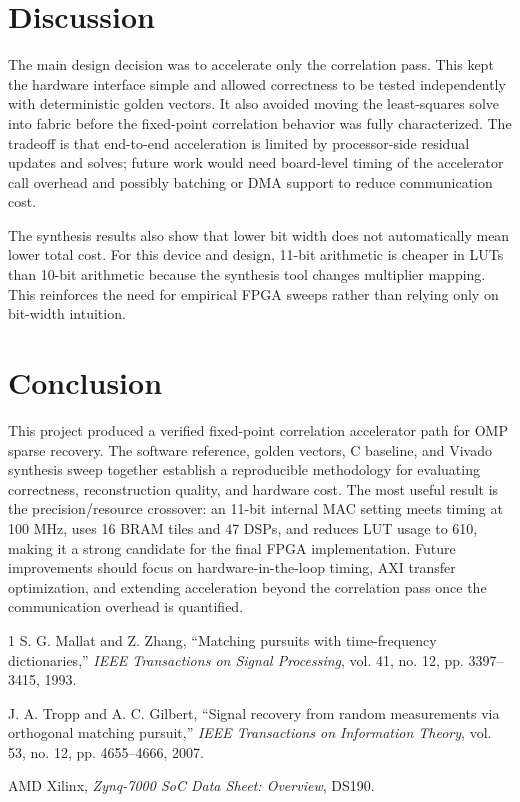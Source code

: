 \documentclass[onecolumn,conference]{IEEEtran}
\begin{document}
\section{Discussion}
The main design decision was to accelerate only the correlation pass. This kept the hardware interface simple and allowed correctness to be tested independently with deterministic golden vectors. It also avoided moving the least-squares solve into fabric before the fixed-point correlation behavior was fully characterized. The tradeoff is that end-to-end acceleration is limited by processor-side residual updates and solves; future work would need board-level timing of the accelerator call overhead and possibly batching or DMA support to reduce communication cost.

The synthesis results also show that lower bit width does not automatically mean lower total cost. For this device and design, 11-bit arithmetic is cheaper in LUTs than 10-bit arithmetic because the synthesis tool changes multiplier mapping. This reinforces the need for empirical FPGA sweeps rather than relying only on bit-width intuition.

\section{Conclusion}
This project produced a verified fixed-point correlation accelerator path for OMP sparse recovery. The software reference, golden vectors, C baseline, and Vivado synthesis sweep together establish a reproducible methodology for evaluating correctness, reconstruction quality, and hardware cost. The most useful result is the precision/resource crossover: an 11-bit internal MAC setting meets timing at 100 MHz, uses 16 BRAM tiles and 47 DSPs, and reduces LUT usage to 610, making it a strong candidate for the final FPGA implementation. Future improvements should focus on hardware-in-the-loop timing, AXI transfer optimization, and extending acceleration beyond the correlation pass once the communication overhead is quantified.

\begin{thebibliography}{1}
S. G. Mallat and Z. Zhang, ``Matching pursuits with time-frequency dictionaries,'' \emph{IEEE Transactions on Signal Processing}, vol. 41, no. 12, pp. 3397--3415, 1993.

J. A. Tropp and A. C. Gilbert, ``Signal recovery from random measurements via orthogonal matching pursuit,'' \emph{IEEE Transactions on Information Theory}, vol. 53, no. 12, pp. 4655--4666, 2007.

AMD Xilinx, \emph{Zynq-7000 SoC Data Sheet: Overview}, DS190.
\end{thebibliography}
\end{document}
